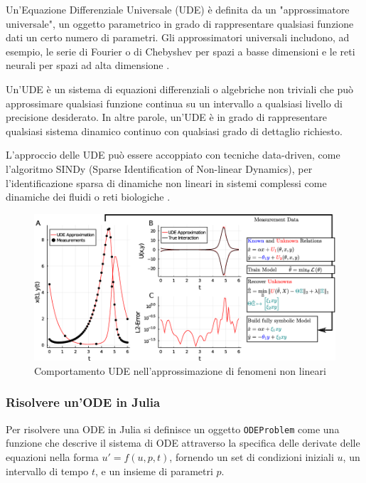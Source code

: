 Un'Equazione Differenziale Universale (UDE) è definita da un 
"approssimatore universale", un oggetto parametrico in grado di 
rappresentare qualsiasi funzione dati un certo numero di parametri. 
Gli approssimatori universali includono, ad esempio, le serie di Fourier 
o di Chebyshev per spazi a basse dimensioni e le reti neurali per spazi 
ad alta dimensione \cite{rackauckas2020universal}.

Un'UDE è un sistema di equazioni differenziali o algebriche non triviali 
che può approssimare qualsiasi funzione continua su un intervallo a 
qualsiasi livello di precisione desiderato. In altre parole, un'UDE è 
in grado di rappresentare qualsiasi sistema dinamico continuo con 
qualsiasi grado di dettaglio richiesto.

L'approccio delle UDE può essere accoppiato con tecniche data-driven, 
come l'algoritmo SINDy (Sparse Identification of Non-linear Dynamics), 
per l'identificazione sparsa di dinamiche non lineari in sistemi 
complessi come dinamiche dei fluidi o reti biologiche \cite{datadrivendiffeq}.

\begin{figure}[H]
    \begin{center}
        \includegraphics[width=\textwidth]{img/ude_approx.png}
        \caption{Comportamento UDE nell'approssimazione di fenomeni non lineari \cite{rackauckas2020universal}}
        \label{fig:UDE_approx}
    \end{center}
\end{figure}

\subsubsection*{Risolvere un'ODE in Julia}

Per risolvere una ODE in Julia si definisce un oggetto \texttt{ODEProblem} come 
una funzione che descrive il sistema di ODE attraverso la specifica 
delle derivate delle equazioni nella forma $u' = f(u, p, t)$, fornendo 
un set di condizioni iniziali $u$, un intervallo di tempo $t$, e un 
insieme di parametri $p$.

